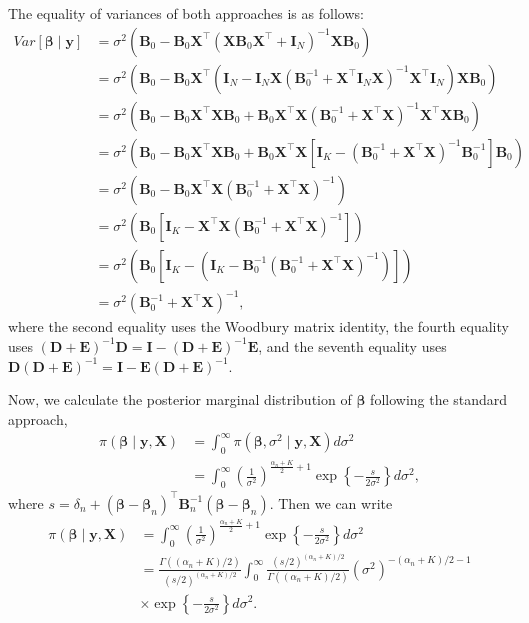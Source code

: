 The equality of variances of both approaches is as follows:
\begin{align*}
		Var[\bm{\beta}\mid \bm{y}]&
		= \sigma^2(\bm{B}_{0}-\bm{B}_{0}\bm{X}^{\top}(\bm{X}\bm{B}_{0}\bm{X}^\top+\bm{I}_N)^{-1} \bm{X}\bm{B}_{0})\\
		&=\sigma^2(\bm{B}_{0}-\bm{B}_{0}\bm{X}^{\top}(\bm{I}_N- \bm{I}_N\bm{X}(\bm{B}_{0}^{-1}+\bm{X}^{\top}\bm{I}_N\bm{X})^{-1}\bm{X}^{\top}\bm{I}_N)\bm{X}\bm{B}_{0})\\
		&=\sigma^2(\bm{B}_{0}-\bm{B}_{0}\bm{X}^{\top}\bm{X}\bm{B}_{0}+ \bm{B}_{0}\bm{X}^{\top}\bm{X}(\bm{B}_{0}^{-1}+\bm{X}^{\top}\bm{X})^{-1}\bm{X}^{\top}\bm{X}\bm{B}_{0})\\
		&=\sigma^2(\bm{B}_{0}-\bm{B}_{0}\bm{X}^{\top}\bm{X}\bm{B}_{0}+ \bm{B}_{0}\bm{X}^{\top}\bm{X}[\bm{I}_K-(\bm{B}_{0}^{-1}+\bm{X}^{\top}\bm{X})^{-1}\bm{B}_{0}^{-1}]\bm{B}_{0})\\
		&=\sigma^2(\bm{B}_{0}-\bm{B}_{0}\bm{X}^{\top}\bm{X}(\bm{B}_{0}^{-1}+\bm{X}^{\top}\bm{X})^{-1})\\
		&=\sigma^2(\bm{B}_{0}[\bm{I}_K-\bm{X}^{\top}\bm{X}(\bm{B}_{0}^{-1}+\bm{X}^{\top}\bm{X})^{-1}])\\
		&=\sigma^2(\bm{B}_{0}[\bm{I}_K-(\bm{I}_K-\bm{B}_{0}^{-1}(\bm{B}_{0}^{-1}+\bm{X}^{\top}\bm{X})^{-1})])\\
		&=\sigma^2(\bm{B}_{0}^{-1}+\bm{X}^{\top}\bm{X})^{-1},
\end{align*}
where the second equality uses the Woodbury matrix identity, the fourth equality uses $(\bm{D}+\bm{E})^{-1}\bm{D}=\bm{I}-(\bm{D}+\bm{E})^{-1}\bm{E}$, and the seventh equality uses $\bm{D}(\bm{D}+\bm{E})^{-1}=\bm{I}-\bm{E}(\bm{D}+\bm{E})^{-1}$.  

Now, we calculate the posterior marginal distribution of $\bm{\beta}$ following the standard approach,
\begin{align*}
	\pi(\bm{\beta}\mid {\bm{y}},{\bm{X}}) & = \int_0^{\infty} \pi(\bm{\beta}, \sigma^2\mid {\bm{y}},{\bm{X}}) d\sigma^2 \\
	& = \int_0^{\infty} \left(\frac{1}{\sigma^2}\right)^{\frac{\alpha_n+K}{2} + 1} \exp \left\{-\frac{s}{2\sigma^2}\right\} d\sigma^2,
\end{align*}
where $s = \delta_n + (\bm{\beta} - \bm{\beta}_n)^{\top}{{\bm{B}}}_n^{-1}(\bm{\beta} - \bm{\beta}_n)$. Then we can write
\begin{align*}
	\pi(\bm{\beta}\mid {\bm{y}},{\bm{X}}) & = \int_0^{\infty} \left(\frac{1}{\sigma^2}\right)^{\frac{\alpha_n+K}{2} + 1} \exp \left\{-\frac{s}{2\sigma^2}\right\} d\sigma^2 \\
	& = \frac{\Gamma((\alpha_n+K)/2)}{(s/2)^{(\alpha_n+K)/2}} \int_0^{\infty} \frac{(s/2)^{(\alpha_n+K)/2}}{\Gamma((\alpha_n+K)/2)} (\sigma^2)^{-(\alpha_n+K)/2 - 1}\\
	&\times \exp \left\{-\frac{s}{2\sigma^2}\right\} d\sigma^2.
\end{align*}

